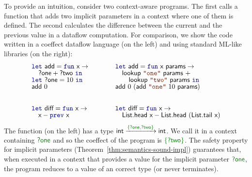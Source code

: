 To provide an intuition, consider two context-aware programs. The first calls a function that
adds two implicit parameters in a context where one of them is defined. The second calculates
the difference between the current and the previous value in a dataflow computation.
For comparison, we show the code written in a coeffect dataflow language (on the left) and 
using standard ML-like libraries (on the right):
%
\begin{equation*}
\begin{array}{lcl}
\begin{array}{l}
\kvd{let}~\ident{add}=\kvd{fun}~\ident{x}\rightarrow\\[-0.2em]
 \quad \ident{?one} + \ident{?two}~\kvd{in}\\[-0.2em]
\kvd{let}~\ident{?one} = 10~\kvd{in}\\[-0.2em] 
\ident{add}~0
\end{array} 
&\quad&
\begin{array}{l}
\kvd{let}~\ident{add}=\kvd{fun}~\ident{x}~\ident{params}\rightarrow\\[-0.2em]
 \quad \ident{lookup}~\str{one}~\ident{params}~+ \\[-0.2em]
 \quad\quad \ident{lookup}~\str{two}~\ident{params}~\kvd{in}\\[-0.2em]
\ident{add}~0~(\ident{add}~\str{one}~10~\ident{params})
\end{array} 
\\[3.5em]
\begin{array}{l}
\kvd{let}~\ident{diff}=\kvd{fun}~\ident{x}\rightarrow\\[-0.2em]
 \quad \ident{x}-\kvd{prev}~\ident{x}
\end{array} 
&&
\begin{array}{l}
\kvd{let}~\ident{diff}=\kvd{fun}~\ident{x}\rightarrow\\[-0.2em]
 \quad \ident{List.head}~\ident{x}-\ident{List.head}~(\ident{List.tail}~\ident{x})
\end{array} 
\end{array} 
\end{equation*}
%
The  function (on the left) has a type $\ident{int}\xrightarrow{\cclrd{ \{ \ident{?one},\ident{?two} \} }}\ident{int}$.
We call it in a context containing $\cclrd{\ident{?one}}$ and so the coeffect of the program is
$\cclrd{ \{ \ident{?two} \} }$. The safety property for implicit parameters
(Theorem~\ref{thm:semantics-sound-impl}) guarantees that, when executed in a context that
provides a value for the implicit parameter $\cclrd{\ident{?one}}$, the program reduces to 
a value of an correct type (or never terminates).


